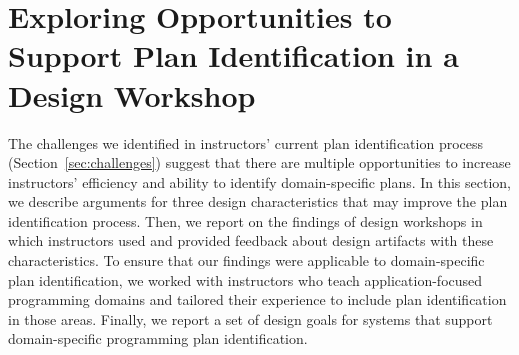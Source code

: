 \section{Exploring Opportunities to Support Plan Identification in a Design Workshop}
\label{sec:design-workshop}



The challenges we identified in instructors' current plan identification process (Section~\ref{sec:challenges}) suggest that there are multiple opportunities to increase instructors' efficiency and ability to identify domain-specific plans. In this section, we describe arguments for three design characteristics that may improve the plan identification process.
Then, we report on the findings of design workshops in which instructors used and provided feedback about design artifacts with these characteristics. To ensure that our findings were applicable to domain-specific plan identification, we worked with instructors who teach application-focused programming domains and tailored their experience to include plan identification in those areas.
Finally, we report a set of design goals for systems that support domain-specific programming plan identification. %



